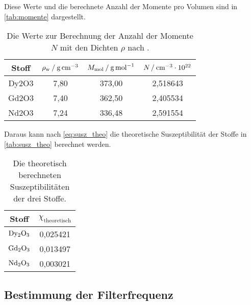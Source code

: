Diese Werte und die berechnete Anzahl der Momente pro Volumen sind in \autoref{tab:momente} dargestellt.
\begin{table}
  \centering
  \caption{Die Werte zur Berechnung der Anzahl der Momente $N$ mit den Dichten $\rho$ nach \cite{v606}.}
  \label{tab:momente}
  \begin{tabular}{c c c c}
    \toprule
    Stoff &     
    $\rho_\text{w} \mathbin{/} \unit[per-mode=reciprocal]{\gram\per\cubic\centi\meter}$ & 
    $M_\text{mol} \mathbin{/} \unit[per-mode=reciprocal]{\gram\per\mol}$ & 
    $N \mathbin{/} \unit[per-mode=reciprocal]{\per\cubic\centi\meter} \cdot 10^{22}$ \\ 
    \midrule
    Dy2O3 &         7,80 &       373,00 &            2,518643 \\
    Gd2O3 &         7,40 &       362,50 &            2,405534 \\
    Nd2O3 &         7,24 &       336,48 &            2,591554 \\
    \bottomrule
    \end{tabular}
\end{table}

Daraus kann nach \autoref{eq:susz_theo} die theoretische Suszeptibilität der Stoffe in \autoref{tab:susz_theo} berechnet werden.
\begin{table}
  \centering
  \caption{Die theoretisch berechneten Suszeptibilitäten der drei Stoffe.}
  \label{tab:susz_theo}
  \begin{tabular}{ c c}
    \toprule
    Stoff & 
    $\chi_\text{theoretisch}$ \\
    \midrule
    $\ce{Dy2O3}$ &  0,025421 \\
    $\ce{Gd2O3}$ &  0,013497 \\
    $\ce{Nd2O3}$ &  0,003021 \\
    \bottomrule
  \end{tabular}
\end{table}


\subsection{Bestimmung der Filterfrequenz}

